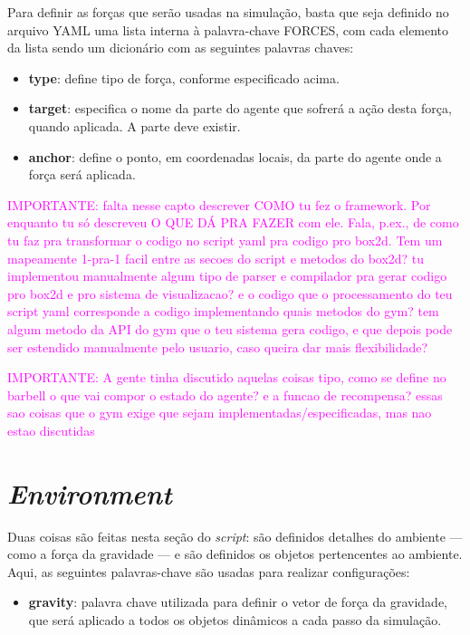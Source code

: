 \documentclass[cic,tc]{iiufrgs}
\newcommand\bruno[1]{\textcolor{magenta}{#1}}
\begin{document}
    
    Para definir as forças que serão usadas na simulação, basta que seja definido no arquivo YAML uma lista interna à palavra-chave FORCES, com cada elemento
    da lista sendo um dicionário com as seguintes palavras chaves:
    \begin{itemize}
      \item \textbf{type}: define tipo de força, conforme especificado acima.
      \item \textbf{target}: especifica o nome da parte do agente que sofrerá a ação desta força, quando aplicada. A parte deve existir.
      \item \textbf{anchor}: define o ponto, em coordenadas locais, da parte do agente onde a força será aplicada.
    \end{itemize}
    
    \bruno{IMPORTANTE: falta nesse capto descrever COMO tu fez o framework. Por enquanto tu só descreveu O QUE DÁ PRA FAZER com ele. Fala, p.ex., de como tu faz pra transformar o codigo no script yaml pra codigo pro box2d. Tem um mapeamente 1-pra-1 facil entre as secoes do script e metodos do box2d? tu implementou manualmente algum tipo de parser e compilador pra gerar codigo pro box2d e pro sistema de visualizacao? e o codigo que o processamento do teu script yaml corresponde a codigo implementando quais metodos do gym? tem algum metodo da API do gym que o teu sistema gera codigo, e que depois pode ser estendido manualmente pelo usuario, caso queira dar mais flexibilidade?}
    
    \bruno{IMPORTANTE: A gente tinha discutido aquelas coisas tipo, como se define no barbell o que vai compor o estado do agente? e a funcao de recompensa? essas sao coisas que o gym exige que sejam implementadas/especificadas, mas nao estao discutidas}
    
    \section{\textit{Environment}}
    Duas coisas são feitas nesta seção do \textit{script}: são definidos detalhes do ambiente --- como a força da gravidade --- e são definidos os objetos
    pertencentes ao ambiente. Aqui, as seguintes palavras-chave são usadas para realizar configurações:
    \begin{itemize}
      \item \textbf{gravity}: palavra chave utilizada para definir o vetor de força da gravidade, que será aplicado a todos os objetos dinâmicos
      a cada passo da simulação.
    \end{itemize}
\end{document}
